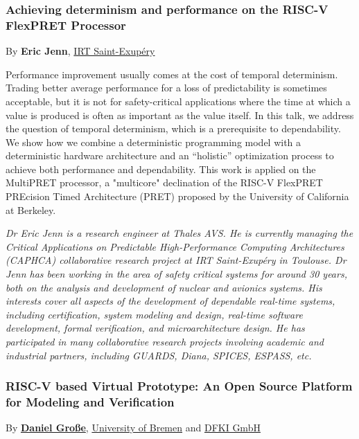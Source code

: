 \documentclass[a4paper, 10pt]{article}
\begin{document}
{\subsubsection{Achieving determinism and performance on the RISC-V FlexPRET Processor}
\label{sec:orgafaed1b}
By \textbf{Eric Jenn}, \href{http://www.irt-saintexupery.com/}{IRT Saint-Exupéry}

Performance improvement usually comes at the cost of temporal
determinism. Trading better average performance for a loss of
predictability is sometimes acceptable, but it is not for
safety-critical applications where the time at which a value is
produced is often as important as the value itself. In this talk, we
address the question of temporal determinism, which is a prerequisite
to dependability. We show how we combine a deterministic programming
model with a deterministic hardware architecture and an “holistic”
optimization process to achieve both performance and
dependability. This work is applied on the MultiPRET processor, a
"multicore" declination of the RISC-V FlexPRET PREcision Timed
Architecture (PRET) proposed by the University of California at
Berkeley.

\emph{\footnotesize Dr Eric Jenn is a research engineer at Thales AVS. He is currently managing the Critical Applications on Predictable High-Performance Computing Architectures (CAPHCA) collaborative research project at IRT Saint-Exupéry in Toulouse. Dr Jenn has been working in the area of safety critical systems for around 30 years, both on the analysis and development of nuclear and avionics systems. His interests cover all aspects of the development of dependable real-time systems, including certification, system modeling and design, real-time software development, formal verification, and microarchitecture design. He has participated in many collaborative research projects involving academic and industrial partners, including GUARDS, Diana, SPICES, ESPASS, etc.}

\subsubsection{RISC-V based Virtual Prototype: An Open Source Platform for Modeling and Verification}
\label{sec:org05c0359}
By \textbf{\href{http://www.informatik.uni-bremen.de/\~grosse/}{Daniel Große}}, \href{https://www.uni-bremen.de}{University of Bremen} and \href{https://www.dfki.de/en/web/}{DFKI GmbH}


}
\end{document}
